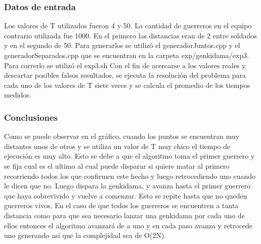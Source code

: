 		\subsubsection*{Datos de entrada}\;

		Los valores de T utilizados fueron 4 y 50.
		La cantidad de guerreros en el equipo contrario utilizada fue 1000.
		En el primero las distancias eran de 2 entre soldados y en el segundo de 50.
		Para generarlos se utilizó el generadorJuntos.cpp y el generadorSeparados.cpp  que se encuentran en la carpeta exp/genkidama/exp3.
		Para correrlo se utilizó el exp3.sh 
		Con el fin de acercarse a los valores reales y descartar posibles falsos resultados, se ejecuta la resolución del problema para cada uno de los valores de T siete veces y se calcula el promedio de los tiempos medidos.\;

    	\subsubsection*{Conclusiones}\;

		Como se puede observar en el gráfico, cuando los puntos se encuentran muy distantes unos de otros y se utiliza un valor de T muy chico el tiempo de ejecución es muy alto. 
		Esto se debe a que el algoritmo toma el primer guerrero y se fija cual es el ultimo al cual puede disparar si quiere matar al primero recorriendo todos los que confirmen este hecho y luego retrocediendo uno cuando le dicen que no. Luego dispara la genkidama, y avanza hasta el primer guerrero que haya sobrevivido y vuelve a comenzar. Esto se repite hasta que no queden guerreros vivos. En el caso de que todos los guerreros se encuentren a tanta distancia como para que sea necesario lanzar una genkidama por cada uno de ellos entonces el algoritmo avanzará de a uno y en cada paso avanza y retrocede uno generando así que la complejidad sea de O(2N). 
